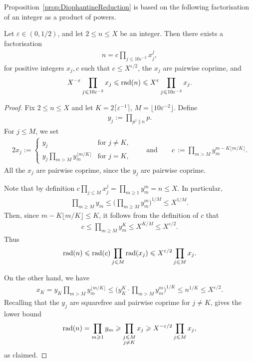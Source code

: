 Proposition~\ref{prop:DiophantineReduction} is based on the following factorisation of an integer as a product of powers.


\begin{lemma}\label{lem:DiophantineFactor}
Let $\varepsilon\in (0,1/2)$, and let $2\leq n\leq X$ be an integer. Then there exists a factorisation
\begin{align*}
n=c\prod_{j\leq 10\varepsilon^{-2}}x_j^{j},
\end{align*}
for positive integers $x_j,c$ such that $c\leq X^{\varepsilon/2}$, the $x_j$ are pairwise coprime, and \begin{align*}
X^{-\varepsilon}\prod_{j\leqslant 10\varepsilon^{-2}}x_j \leqslant \operatorname{rad}(n) \leqslant X^{\varepsilon}\prod_{j\leqslant 10\varepsilon^{-2}}x_j.
\end{align*}
\end{lemma}
\begin{proof}
  Fix $2\le n\le X$ and let $K=2\lceil \varepsilon^{-1}\rceil$, $M=\lfloor 10\varepsilon^{-2}\rfloor$. Define
\begin{align*}
y_j:=\prod_{p^j\|n} p.
\end{align*}
For $j\leq M$, we set
\begin{alignat*}{2}
x_j:=\begin{cases}y_j & \text{for $j\neq K$},\\
y_j\prod_{m>M}y_m^{\lfloor m/K\rfloor} & \text{for $j=K$},
\end{cases}\qquad\text{and}\qquad
c\,:=\prod_{m>M}y_m^{m-K\lfloor m/K\rfloor}.
\end{alignat*}
All the $x_j$ are pairwise coprime, since the $y_j$ are pairwise coprime.


Note that by definition $c\prod_{j\leq M}x_j^j=\prod_{m\geq 1}y_m^m=n\leq X$. In particular,
\begin{align*}
\prod_{m\geq M}y_m\leq \Big(\prod_{m\geq M}y_m^{m}\Big)^{1/M}\leq X^{1/M}.
\end{align*}
Then, since $m-K\lfloor m/K\rfloor \le K$, it follows from the definition of $c$ that
\begin{align*}
c\leq \prod_{m\geq M}y_m^K\leq X^{K/M}\leq X^{\varepsilon/2}.
\end{align*}
Thus
\[
\operatorname{rad}(n)\leqslant \operatorname{rad}(c)\prod_{j\leqslant M}\operatorname{rad}(x_j)\leqslant X^{\varepsilon/2} \prod_{j\leqslant M} x_j.
\]

On the other hand, we have
\begin{align*}
x_K = y_K\prod_{m> M}y_m^{\lfloor m/K\rfloor}\leq \Big(y_K^K\cdot\prod_{m> M}y_m^m\Big)^{1/K}\leq n^{1/K}\leq X^{\varepsilon/2}.
\end{align*}
Recalling that the $y_j$ are squarefree and pairwise coprime for $j\neq K$, gives the lower bound
\[
\operatorname{rad}(n)=\prod_{m\geqslant 1}y_m \geqslant \prod_{\substack{j\leqslant M\\j\neq K}}x_j\geqslant X^{-\varepsilon/2}\prod_{j\leqslant M}x_j,
\]
as claimed.
\end{proof}

